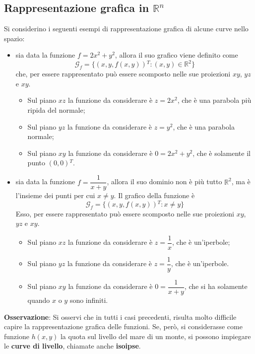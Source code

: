 \documentclass[a4paper]{extarticle}
\begin{document}
\subsection{Rappresentazione grafica in $\mathbb{R}^n$}
Si considerino i seguenti esempi di rappresentazione grafica di alcune curve nello spazio:
\begin{itemize}
    \item sia data la funzione $f=2x^2+y^2$, allora il suo grafico viene definito come
    \[\mathcal{G}_f = \{(x,y,f(x,y)){^T} : (x,y) \in \mathbb{R}^2\}\]
    che, per essere rappresentato può essere scomposto nelle sue proiezioni $xy$, $yz$ e $xy$.
    \begin{itemize}
        \item Sul piano $xz$ la funzione da considerare è $z=2x^2$, che è una parabola più ripida del normale;
        \item Sul piano $yz$ la funzione da considerare è $z=y^2$, che è una parabola normale;
        \item Sul piano $xy$ la funzione da considerare è $0=2x^2+y^2$, che è solamente il punto $(0,0){^T}$.
    \end{itemize}

    \item sia data la funzione $f=\dfrac{1}{x+y}$, allora il suo dominio non è più tutto $\mathbb{R}^2$, ma è l'insieme dei punti per cui $x \neq y$. Il grafico della funzione è
    \[\mathcal{G}_f = \{(x,y,f(x,y)){^T} : x \neq y\}\]
    Esso, per essere rappresentato può essere scomposto nelle sue proiezioni $xy$, $yz$ e $xy$.
    \begin{itemize}
        \item Sul piano $xz$ la funzione da considerare è $z=\dfrac{1}{x}$, che è un'iperbole;
        \item Sul piano $yz$ la funzione da considerare è $z=\dfrac{1}{y}$, che è un'iperbole.
        \item Sul piano $xy$ la funzione da considerare è $0=\dfrac{1}{x+y}$, che si ha solamente quando $x$ o $y$ sono infiniti.
    \end{itemize}
\end{itemize}

\vspace{1em}
\noindent
\textbf{Osservazione}: Si osservi che in tutti i casi precedenti, risulta molto difficile capire la rappresentazione grafica delle funzioni. Se, però, si considerasse come funzione $h(x,y)$ la quota sul livello del mare di un monte, si possono impiegare le \textbf{curve di livello}, chiamate anche \textbf{isoipse}.
\end{document}
